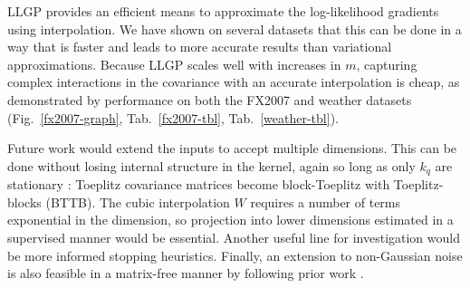 \documentclass{article}
\begin{document}
LLGP provides an efficient means to approximate the log-likelihood gradients using interpolation. We have shown on several datasets that this can be done in a way that is faster and leads to more accurate results than variational approximations. Because LLGP scales well with increases in $m$, capturing complex interactions in the covariance with an accurate interpolation is cheap, as demonstrated by performance on both the FX2007 and weather datasets (Fig.~\ref{fx2007-graph}, Tab.~\ref{fx2007-tbl}, Tab.~\ref{weather-tbl}).

Future work would extend the inputs to accept multiple dimensions. This can be done without losing internal structure in the kernel, again so long as only $k_q$ are stationary \cite{msgp}: Toeplitz covariance matrices become block-Toeplitz with Toeplitz-blocks (BTTB). The cubic interpolation $W$ requires a number of terms exponential in the dimension, so projection into lower dimensions estimated in a supervised manner would be essential.
Another useful line for investigation would be more informed stopping heuristics. %
Finally, an extension to non-Gaussian noise is also feasible in a matrix-free manner by following prior work \cite{cutajar2016preconditioning}.



\end{document}
